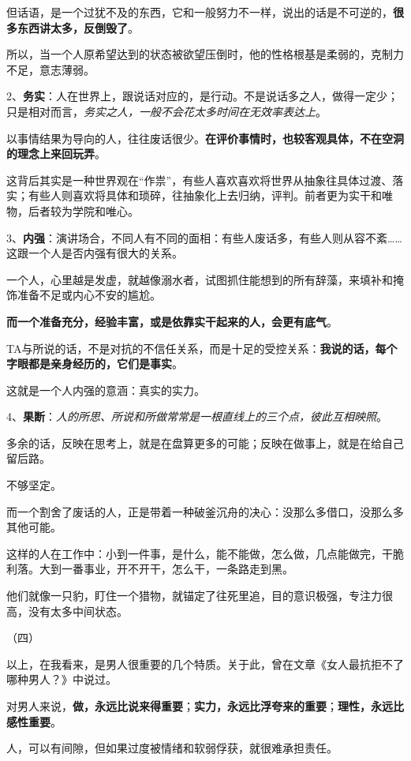 \documentclass[UTF8,a4paper,8pt]{ctexart}
\begin{document}
 但话语，是一个过犹不及的东西，它和一般努力不一样，说出的话是不可逆的，\textbf{很多东西讲太多，反倒毁了}。
 
 所以，当一个人原希望达到的状态被欲望压倒时，他的性格根基是柔弱的，克制力不足，意志薄弱。
 
 2、\textbf{务实}：人在世界上，跟说话对应的，是行动。不是说话多之人，做得一定少；只是相对而言，\textit{务实之人，一般不会花太多时间在无效率表达上}。
 
 以事情结果为导向的人，往往废话很少。\textbf{在评价事情时，也较客观具体，不在空洞的理念上来回玩弄}。
 
 这背后其实是一种世界观在“作祟”，有些人喜欢喜欢将世界从抽象往具体过渡、落实；有些人则喜欢将具体和琐碎，往抽象化上去归纳，评判。前者更为实干和唯物，后者较为学院和唯心。
 
 3、\textbf{内强}：演讲场合，不同人有不同的面相：有些人废话多，有些人则从容不紊……这跟一个人是否内强有很大的关系。
 
 一个人，心里越是发虚，就越像溺水者，试图抓住能想到的所有辞藻，来填补和掩饰准备不足或内心不安的尴尬。
 
 \textbf{而一个准备充分，经验丰富，或是依靠实干起来的人，会更有底气}。
 
 TA与所说的话，不是对抗的不信任关系，而是十足的受控关系：\textbf{我说的话，每个字眼都是亲身经历的，它们是事实}。
 
 这就是一个人内强的意涵：真实的实力。
 
 4、\textbf{果断}：\textit{人的所思、所说和所做常常是一根直线上的三个点，彼此互相映照}。
 
 多余的话，反映在思考上，就是在盘算更多的可能；反映在做事上，就是在给自己留后路。
 
 不够坚定。
 
 而一个割舍了废话的人，正是带着一种破釜沉舟的决心：没那么多借口，没那么多其他可能。
 
 这样的人在工作中：小到一件事，是什么，能不能做，怎么做，几点能做完，干脆利落。大到一番事业，开不开干，怎么干，一条路走到黑。
 
 他们就像一只豹，盯住一个猎物，就锚定了往死里追，目的意识极强，专注力很高，没有太多中间状态。
 
 
 
 （四）
 
 以上，在我看来，是男人很重要的几个特质。关于此，曾在文章《女人最抗拒不了哪种男人？》中说过。
 
 对男人来说，\textbf{做，永远比说来得重要}；\textbf{实力，永远比浮夸来的重要}；\textbf{理性，永远比感性重要}。
 
 人，可以有间隙，但如果过度被情绪和软弱俘获，就很难承担责任。
 
\end{document}
